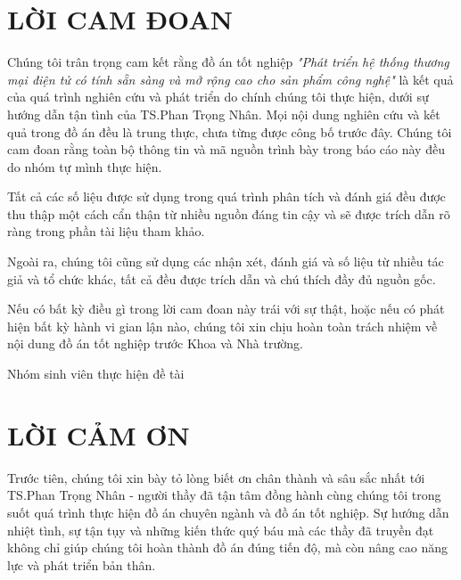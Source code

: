


\section*{\Huge LỜI CAM ĐOAN}
Chúng tôi trân trọng cam kết rằng đồ án tốt nghiệp \textit{"Phát triển hệ thống thương mại điện tử có tính sẵn sàng và mở rộng cao cho sản phẩm công nghệ"} là kết quả của quá trình nghiên cứu và phát triển do chính chúng tôi thực hiện, dưới sự hướng dẫn tận tình của TS.Phan Trọng Nhân. Mọi nội dung nghiên cứu và kết quả trong đồ án đều là trung thực, chưa từng được công bố trước đây. Chúng tôi cam đoan rằng toàn bộ thông tin và mã nguồn trình bày trong báo cáo này đều do nhóm tự mình thực hiện.\vspace{0.5cm}

Tất cả các số liệu được sử dụng trong quá trình phân tích và đánh giá đều được thu thập một cách cẩn thận từ nhiều nguồn đáng tin cậy và sẽ được trích dẫn rõ ràng trong phần tài liệu tham khảo.\vspace{0.5cm}

Ngoài ra, chúng tôi cũng sử dụng các nhận xét, đánh giá và số liệu từ nhiều tác giả và tổ chức khác, tất cả đều được trích dẫn và chú thích đầy đủ nguồn gốc.\vspace{0.5cm}

Nếu có bất kỳ điều gì trong lời cam đoan này trái với sự thật, hoặc nếu có phát hiện bất kỳ hành vi gian lận nào, chúng tôi xin chịu hoàn toàn trách nhiệm về nội dung đồ án tốt nghiệp trước Khoa và Nhà trường.\vspace{0.5cm}

\begin{flushright}
Nhóm sinh viên thực hiện đề tài
\end{flushright}
\newpage
\section*{\Huge LỜI CẢM ƠN}
Trước tiên, chúng tôi xin bày tỏ lòng biết ơn chân thành và sâu sắc nhất tới TS.Phan Trọng Nhân - người thầy đã tận tâm đồng hành cùng chúng tôi trong suốt quá trình thực hiện đồ án chuyên ngành và đồ án tốt nghiệp. Sự hướng dẫn nhiệt tình, sự tận tụy và những kiến thức quý báu mà các thầy đã truyền đạt không chỉ giúp chúng tôi hoàn thành đồ án đúng tiến độ, mà còn nâng cao năng lực và phát triển bản thân.\vspace{0.5cm}

